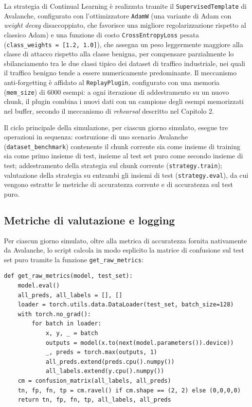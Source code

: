 \documentclass[12pt,a4paper]{report}
\begin{document}
La strategia di Continual Learning è realizzata tramite il \texttt{SupervisedTemplate} di Avalanche, configurato con l'ottimizzatore \texttt{AdamW} (una variante di Adam con \emph{weight decay} disaccoppiato, che favorisce una migliore regolarizzazione rispetto al classico Adam) e una funzione di costo \texttt{CrossEntropyLoss} pesata (\texttt{class\_weights = [1.2, 1.0]}), che assegna un peso leggermente maggiore alla classe di attacco rispetto alla classe benigna, per compensare parzialmente lo sbilanciamento tra le due classi tipico dei dataset di traffico industriale, nei quali il traffico benigno tende a essere numericamente predominante. Il meccanismo anti-forgetting è affidato al \texttt{ReplayPlugin}, configurato con una memoria (\texttt{mem\_size}) di 6000 esempi: a ogni iterazione di addestramento su un nuovo chunk, il plugin combina i nuovi dati con un campione degli esempi memorizzati nel buffer, secondo il meccanismo di \emph{rehearsal} descritto nel Capitolo 2.

Il ciclo principale della simulazione, per ciascun giorno simulato, esegue tre operazioni in sequenza: costruzione di uno scenario Avalanche (\texttt{dataset\_benchmark}) contenente il chunk corrente sia come insieme di training sia come primo insieme di test, insieme al test set puro come secondo insieme di test; addestramento della strategia sul chunk corrente (\texttt{strategy.train}); valutazione della strategia su entrambi gli insiemi di test (\texttt{strategy.eval}), da cui vengono estratte le metriche di accuratezza corrente e di accuratezza sul test puro.

\subsection{Metriche di valutazione e logging}

Per ciascun giorno simulato, oltre alla metrica di accuratezza fornita nativamente da Avalanche, lo script calcola in modo esplicito la matrice di confusione sul test set puro tramite la funzione \texttt{get\_raw\_metrics}:

\begin{lstlisting}[caption={Calcolo delle metriche raw sul test set puro (\texttt{validazioneACDBconEmbedding.py})}]
def get_raw_metrics(model, test_set):
    model.eval()
    all_preds, all_labels = [], []
    loader = torch.utils.data.DataLoader(test_set, batch_size=128)
    with torch.no_grad():
        for batch in loader:
            x, y, _ = batch
            outputs = model(x.to(next(model.parameters()).device))
            _, preds = torch.max(outputs, 1)
            all_preds.extend(preds.cpu().numpy())
            all_labels.extend(y.cpu().numpy())
    cm = confusion_matrix(all_labels, all_preds)
    tn, fp, fn, tp = cm.ravel() if cm.shape == (2, 2) else (0,0,0,0)
    return tn, fp, fn, tp, all_labels, all_preds
\end{lstlisting}
\end{document}

